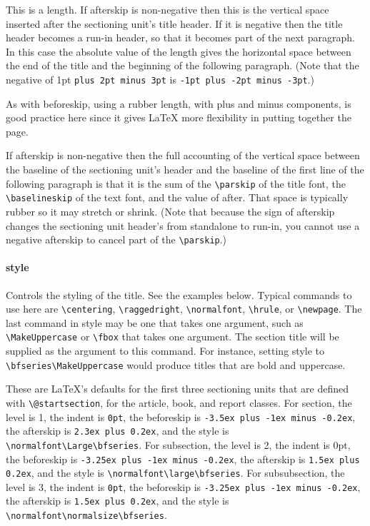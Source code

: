 This is a length. If afterskip is non-negative then this is the vertical space
inserted after the sectioning unit’s title header. If it is negative then the
title header becomes a run-in header, so that it becomes part of the next
paragraph. In this case the absolute value of the length gives the horizontal
space between the end of the title and the beginning of the following
paragraph. (Note that the negative of 1pt \verb|plus 2pt minus 3pt| is
\verb|-1pt plus -2pt minus -3pt|.)

As with beforeskip, using a rubber length, with plus and minus components,
is good practice here since it gives LaTeX more flexibility in putting
together the page.

If afterskip is non-negative then the full accounting of the vertical space
between the baseline of the sectioning unit’s header and the baseline of
the first line of the following paragraph is that it is the sum of the
\verb|\parskip| of the title font, the \verb|\baselineskip| of the text font, and the
value of after. That space is typically rubber so it may stretch or shrink.
(Note that because the sign of afterskip changes the sectioning unit
header’s from standalone to run-in, you cannot use a negative afterskip to
cancel part of the \verb|\parskip|.) 

\paragraph{style}

Controls the styling of the title. See the examples below. Typical commands to
use here are \verb|\centering|, \verb|\raggedright|, \verb|\normalfont|,
\verb|\hrule|, or \verb|\newpage|. The last command in style may be one that
takes one argument, such as \verb|\MakeUppercase| or \verb|\fbox| that takes one argument.
The section title will be supplied as the argument to this command. For
instance, setting style to \verb|\bfseries\MakeUppercase| would produce titles that
are bold and uppercase. 

These are LaTeX’s defaults for the first three sectioning units that are
defined with \verb|\@startsection|, for the article, book, and report classes. For
section, the level is 1, the indent is \verb|0pt|, the beforeskip is 
\verb|-3.5ex plus -1ex minus -0.2ex|, the afterskip is \verb|2.3ex plus 0.2ex|, and the style is
\verb|\normalfont\Large\bfseries|. For subsection, the level is 2, the indent is 0pt,
the beforeskip is \verb|-3.25ex plus -1ex minus -0.2ex|, the afterskip is 
\verb|1.5ex plus 0.2ex|, and the style is \verb|\normalfont\large\bfseries|. For subsubsection, the
level is 3, the indent is \verb|0pt|, the beforeskip is 
\verb|-3.25ex plus -1ex minus -0.2ex|, the afterskip is \verb|1.5ex plus 0.2ex|, and the style is
\verb|\normalfont\normalsize\bfseries|.

